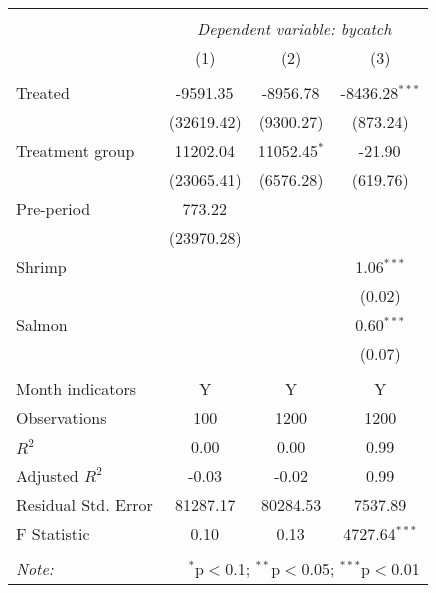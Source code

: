 \begin{table}[!htbp] \centering
\begin{tabular}{@{\extracolsep{5pt}}lccc}
\\[-1.8ex]\hline
\hline \\[-1.8ex]
& \multicolumn{3}{c}{\textit{Dependent variable: bycatch}} \
\cr \cline{2-4}
\\[-1.8ex] & (1) & (2) & (3) \\
\hline \\[-1.8ex]
 Treated & -9591.35$^{}$ & -8956.78$^{}$ & -8436.28$^{***}$ \\
& (32619.42) & (9300.27) & (873.24) \\
 Treatment group & 11202.04$^{}$ & 11052.45$^{*}$ & -21.90$^{}$ \\
& (23065.41) & (6576.28) & (619.76) \\
 Pre-period & 773.22$^{}$ & & \\
& (23970.28) & & \\
 Shrimp & & & 1.06$^{***}$ \\
& & & (0.02) \\
 Salmon & & & 0.60$^{***}$ \\
& & & (0.07) \\
\hline \\[-1.8ex]
 Month indicators & Y & Y & Y \\
 Observations & 100 & 1200 & 1200 \\
 $R^2$ & 0.00 & 0.00 & 0.99 \\
 Adjusted $R^2$ & -0.03 & -0.02 & 0.99 \\
 Residual Std. Error & 81287.17 & 80284.53 & 7537.89 \\
 F Statistic & 0.10$^{}$ & 0.13$^{}$ & 4727.64$^{***}$ \\
\hline
\hline \\[-1.8ex]
\textit{Note:} & \multicolumn{3}{r}{$^{*}$p$<$0.1; $^{**}$p$<$0.05; $^{***}$p$<$0.01} \\
\end{tabular}
\end{table}